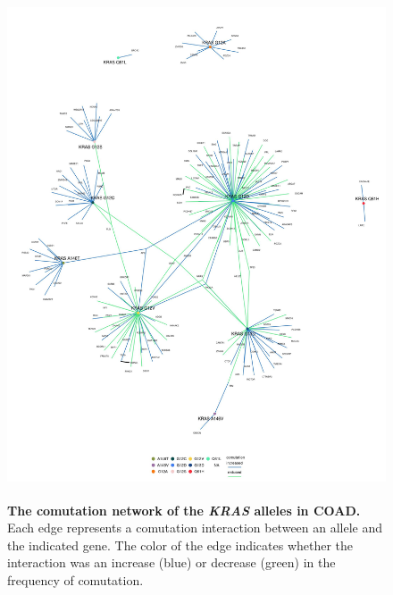 \documentclass[english, 12pt, letterpaper]{article}
\newcommand{\KRAS}{\emph{KRAS}}
\begin{document}
\begin{figure}[p]
\centering
\includegraphics[height=150mm]{figures/SuppFigure_05.jpeg}
\caption{
    \textbf{The comutation network of the \KRAS{} alleles in COAD.} Each edge represents a comutation interaction between an allele and the indicated gene. The color of the edge indicates whether the interaction was an increase (blue) or decrease (green) in the frequency of comutation.
}
\label{sfig:coad_labeled-comutation}
\end{figure}
\end{document}
